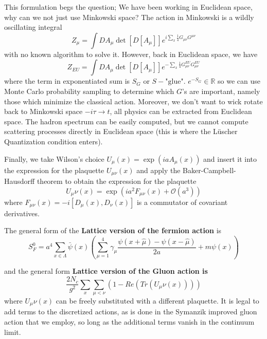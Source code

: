 This formulation begs the question; We have been working in Euclidean space, why can we not just use Minkowski space? The action in Minkowski is a wildly oscillating integral 
\begin{equation}
    Z_\mu = \int DA_\mu \det\left[D[A_\mu]\right] e^{i \sum_{x}^{}\frac{1}{4}G_{\mu\nu}G^{\mu\nu}}
\end{equation}
with no known algorithm to solve it. However, back in Euclidean space, we have 
\begin{equation}
    Z_{EU} = \int DA_\mu \det\left[D[A_\mu]\right] e^{- \sum_{x}^{}\frac{1}{4}G_{\mu\nu}^{EU}G_{\mu\nu}^{EU}}
\end{equation} where the term in exponentiated sum is $S_G$ or $S - \text{"glue"}$. $e^{-S_G} \in \mathbb{R}$ so we can use Monte Carlo probability sampling to determine which $G$'s are important, namely those which minimize the classical action. Moreover, we don't want to wick rotate back to Minkowski space $-i\tau \to t$, all physics can be extracted from Euclidean space. The hadron spectrum can be easily computed, but we cannot compute scattering processes directly in Euclidean space (this is where the L\"{u}scher Quantization condition enters). 

Finally, we take Wilson's choice $U_\mu(x) = \exp\left(iaA_\mu(x)\right)$ and insert it into the expression for the plaquette $U_{\mu\nu}(x)$ and apply the Baker-Campbell-Hausdorff theorem\cite{Hall2004LieGL} to obtain the expression for the plaquette 
\begin{equation}
    U_\mu\nu(x) = \exp\left(ia^2F_{\mu\nu}(x) + \mathcal{O}(a^3) \right)
\end{equation} where $F_{\mu\nu}(x) = -i\left[D_\mu(x),D_\nu(x)\right]$ is a commutator of covariant derivatives. 

The general form of the \textbf{Lattice version of the fermion action} is
\begin{equation}
    S_F^0 = a^4 \sum_{x\in\Lambda}^{} \bar{\psi}(x)\left(\sum_{\mu=1}^{4} \gamma_\mu \frac{\psi(x+\hat{\mu}) -\psi(x-\hat{\mu}) }{2a} + m\psi(x)\right)
\end{equation}

and the general form \textbf{Lattice version of the Gluon action is} 
\begin{equation}
    \frac{2N_c}{g^2} \sum_{x}^{} \sum_{\mu<\nu}^{} \left(1 - Re(Tr(U_\mu\nu(x)))\right)
\end{equation}
where $U_\mu\nu(x)$ can be freely substituted with a different plaquette. It is legal to add terms to the discretized actions, as is done in the Symanzik improved gluon action that we employ, so long as the additional terms vanish in the continuum limit.  

